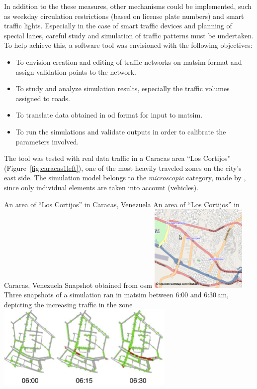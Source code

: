 In addition to the these measures, other mechanisms could be implemented, such as weekday circulation restrictions (\eg based on license plate numbers) and smart traffic lights. Especially in the case of smart traffic devices and planning of special lanes, careful study and simulation of traffic patterns must be undertaken. To help achieve this, a software tool was envisioned with the following objectives:

\begin{itemize}
 \item To envision creation and editing of traffic networks on \gls{matsim} format and assign validation points to the network.

\item To study and analyze simulation results, especially the traffic volumes assigned to roads.

\item To translate data obtained in \gls{od} format for input to \gls{matsim}.

\item To run the simulations and validate outputs in order to calibrate the parameters involved.
\end{itemize}

The tool was tested with real data traffic in a Caracas area ``Los Cortijos'' (Figure~\ref{fig:caracas1left}), one of the most heavily traveled zones on the city's east side. The simulation model belongs to the \emph{microscopic} category, made by \citet{gartner2001}, since only individual elements are taken into account (\ie vehicles).

\createfigure%
{An area of ``Los Cortijos'' in Caracas, Venezuela}%
{An area of ``Los Cortijos'' in Caracas, Venezuela}%
{\label{fig:caracas1}}%
{%
 \createsubfigure%
 {Snapshot obtained from \gls{osm}}
 {\includegraphics[width=0.35\textwidth, angle=0]{./scenarios/figures/caracas0.png}}
 {\label{fig:caracas1left}}
\createsubfigure%
 {Three snapshots of a simulation ran in \gls{matsim} between 6:00 and 6:30\,am, depicting the increasing traffic in the zone}
 {\includegraphics[width=0.64\textwidth, angle=0]{./scenarios/figures/caracas1.jpg}}
 {\label{fig:caracas1right}}
}%
{}

